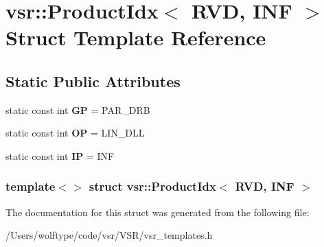 \hypertarget{structvsr_1_1_product_idx_3_01_r_v_d_00_01_i_n_f_01_4}{\section{vsr\-:\-:Product\-Idx$<$ R\-V\-D, I\-N\-F $>$ Struct Template Reference}
\label{structvsr_1_1_product_idx_3_01_r_v_d_00_01_i_n_f_01_4}
}
\subsection*{Static Public Attributes}
\begin{DoxyCompactItemize}
\item 
\hypertarget{structvsr_1_1_product_idx_3_01_r_v_d_00_01_i_n_f_01_4_affe7ec88f407ee7eb3f87fb216ac5734}{static const int {\bfseries G\-P} = P\-A\-R\-\_\-\-D\-R\-B}\label{structvsr_1_1_product_idx_3_01_r_v_d_00_01_i_n_f_01_4_affe7ec88f407ee7eb3f87fb216ac5734}

\item 
\hypertarget{structvsr_1_1_product_idx_3_01_r_v_d_00_01_i_n_f_01_4_a6948df162d876b6f760ded2c92ab6c38}{static const int {\bfseries O\-P} = L\-I\-N\-\_\-\-D\-L\-L}\label{structvsr_1_1_product_idx_3_01_r_v_d_00_01_i_n_f_01_4_a6948df162d876b6f760ded2c92ab6c38}

\item 
\hypertarget{structvsr_1_1_product_idx_3_01_r_v_d_00_01_i_n_f_01_4_a1f7bd64578addc3399b8a56e204a915d}{static const int {\bfseries I\-P} = I\-N\-F}\label{structvsr_1_1_product_idx_3_01_r_v_d_00_01_i_n_f_01_4_a1f7bd64578addc3399b8a56e204a915d}

\end{DoxyCompactItemize}
\subsubsection*{template$<$$>$ struct vsr\-::\-Product\-Idx$<$ R\-V\-D, I\-N\-F $>$}



The documentation for this struct was generated from the following file\-:\begin{DoxyCompactItemize}
\item 
/\-Users/wolftype/code/vsr/\-V\-S\-R/vsr\-\_\-templates.\-h\end{DoxyCompactItemize}
